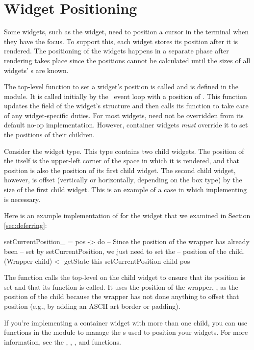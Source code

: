 \section{Widget Positioning}
\label{sec:widget_positioning}

Some widgets, such as the  widget, need to position a cursor
in the terminal when they have the focus.  To support this, each
widget stores its position after it is rendered.  The positioning of
the widgets happens in a separate phase after rendering takes place
since the positions cannot be calculated until the sizes of all
widgets' s are known.

The top-level function to set a widget's position is called
 and is defined in the  module.  It is
called initially by the \vtyui\ event loop with a position of .  This function updates the  field of the
widget's  structure and then calls its
 function to take care of any widget-specific
duties.  For most widgets,  need not be
overridden from its default no-op implementation.  However, container
widgets \textit{must} override it to set the positions of their
children.

Consider the  widget type.  This type contains two child
widgets.  The position of the  itself is the upper-left corner
of the space in which it is rendered, and that position is also the
position of its first child widget.  The second child widget, however,
is offset (vertically or horizontally, depending on the box type) by
the size of the first child widget.  This is an example of a case in
which implementing  is necessary.

Here is an example implementation of  for the
 widget that we examined in Section \ref{sec:deferring}:

\begin{haskellcode}
 setCurrentPosition_ = \this pos -> do
   -- Since the position of the wrapper has already been
   -- set by setCurrentPosition, we just need to set the
   -- position of the child.
   (Wrapper child) <- getState this
   setCurrentPosition child pos
\end{haskellcode}

The function calls the top-level  on the child
widget to ensure that its position is set and that its
 function is called.  It uses the position of
the wrapper, , as the position of the child because the
wrapper has not done anything to offset that position (e.g., by adding
an ASCII art border or padding).

If you're implementing a container widget with more than one child,
you can use functions in the  module to manage the
s used to position your widgets.  For more
information, see the , , ,
and  functions.
